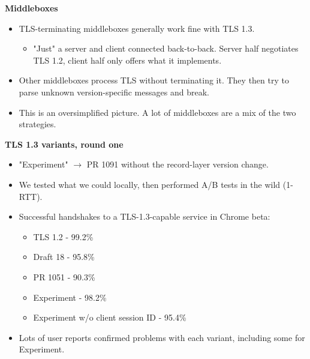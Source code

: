 \documentclass[helvetica]{seminar}
\newcommand{\heading}[1]{%
  \begin{center} 
    \large\bf 
    #1 
  \end{center} 
  \vspace{.4 in}}
\begin{document}
\begin{slide}
\heading{Middleboxes}


\begin{itemize}
\item TLS-terminating middleboxes generally work fine with TLS 1.3.
  \begin{itemize}
  \item  "Just" a server and client connected back-to-back. Server half negotiates TLS 1.2, client half only offers what it implements.
  \end{itemize}

\item Other middleboxes process TLS without terminating it. They then try to parse unknown version-specific messages and break.
  
\item This is an oversimplified picture. A lot of middleboxes are a mix of the two strategies.
  
\end{itemize}

\end{slide}


\begin{slide}
\heading{TLS 1.3 variants, round one}

\vspace{-.5in}
\begin{itemize}
\item  "Experiment" $\rightarrow$ PR 1091 without the record-layer version change.
\item  We tested what we could locally, then performed A/B tests in the wild (1-RTT).
\item  Successful handshakes to a TLS-1.3-capable service in Chrome beta:
  \begin{itemize}
   \item  TLS 1.2    - 99.2\%
   \item  Draft 18   - 95.8\%
   \item  PR 1051    - 90.3\%
   \item  Experiment - 98.2\%
   \item  Experiment w/o client session ID - 95.4\%
   \end{itemize}
\item Lots of user reports confirmed problems with each variant, including some for Experiment.
\end{itemize}
\end{slide}
\end{document}
